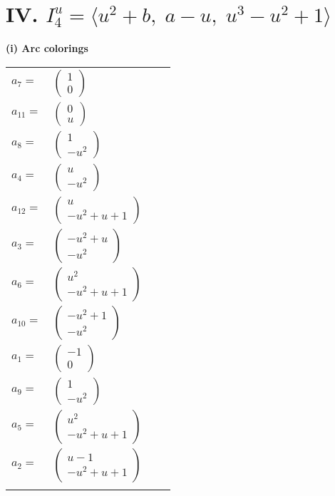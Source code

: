 \documentclass[1p]{elsarticle_modified}
\theoremstyle{definition}
\begin{document}
\centering \section*{IV. $I^u_{4}= \langle u^2+b,\;a- u,\;u^3- u^2+1 \rangle$}
\flushleft \textbf{(i) Arc colorings}\\
\begin{tabular}{m{7pt} m{180pt} m{7pt} m{180pt} }
\flushright $a_{7}=$&$\begin{pmatrix}1\\0\end{pmatrix}$ \\
\flushright $a_{11}=$&$\begin{pmatrix}0\\u\end{pmatrix}$ \\
\flushright $a_{8}=$&$\begin{pmatrix}1\\- u^2\end{pmatrix}$ \\
\flushright $a_{4}=$&$\begin{pmatrix}u\\- u^2\end{pmatrix}$ \\
\flushright $a_{12}=$&$\begin{pmatrix}u\\- u^2+u+1\end{pmatrix}$ \\
\flushright $a_{3}=$&$\begin{pmatrix}- u^2+u\\- u^2\end{pmatrix}$ \\
\flushright $a_{6}=$&$\begin{pmatrix}u^2\\- u^2+u+1\end{pmatrix}$ \\
\flushright $a_{10}=$&$\begin{pmatrix}- u^2+1\\- u^2\end{pmatrix}$ \\
\flushright $a_{1}=$&$\begin{pmatrix}-1\\0\end{pmatrix}$ \\
\flushright $a_{9}=$&$\begin{pmatrix}1\\- u^2\end{pmatrix}$ \\
\flushright $a_{5}=$&$\begin{pmatrix}u^2\\- u^2+u+1\end{pmatrix}$ \\
\flushright $a_{2}=$&$\begin{pmatrix}u-1\\- u^2+u+1\end{pmatrix}$\\&\end{tabular}
\end{document}
